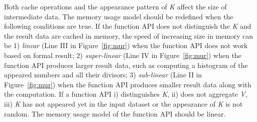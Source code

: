 Both cache operations and the appearance pattern of \textit{K} affect the  size of intermediate data. 
The memory usage model should be redefined when the following conditions are true.
If the function API does not distinguish the \textit{K} and the result data are cached in memory, the speed of increasing size in memory can be 1) \textit{linear} (Line III in Figure~\ref{fig:mur}) when the function API does not work based on formal result; 2) \textit{super-linear} (Line IV in Figure~\ref{fig:mur}) when the function API produces larger result data, such as computing a histogram of the appeared numbers and all their divisors; 3) \textit{sub-linear} (Line II in Figure~\ref{fig:mur}) when the function API produces smaller result data along with the computation.
If a function API i) distinguishes \textit{K}, ii) does not aggregate \textit{V}, iii) \textit{K} has not appeared yet in the input dataset or the appearance of \textit{K} is not random. The memory usage model of the function API should be linear.

\begin{comment}
\begin{itemize}

\item If the function API does not distinguish the \textit{K} and the result data are cached in memory, the speed of increasing size in memory can be 1) \textit{linear} (Line III in Figure~\ref{fig:mur}) when the function API does not work based on formal result; 2) \textit{super-linear} (Line IV in Figure~\ref{fig:mur}) when the function API produces larger result data, such as computing a histogram of the appeared numbers and all their divisors; 3) \textit{sub-linear} (Line II in Figure~\ref{fig:mur}) when the function API produces smaller result data along with the computation. 

\item If a function API i) distinguishes \textit{K}, ii) does not aggregate \textit{V}, iii) \textit{K} has not appeared yet in the input dataset or the appearance of \textit{K} is not random. The memory usage model of the function API should be linear.

\end{itemize}
\end{comment}

